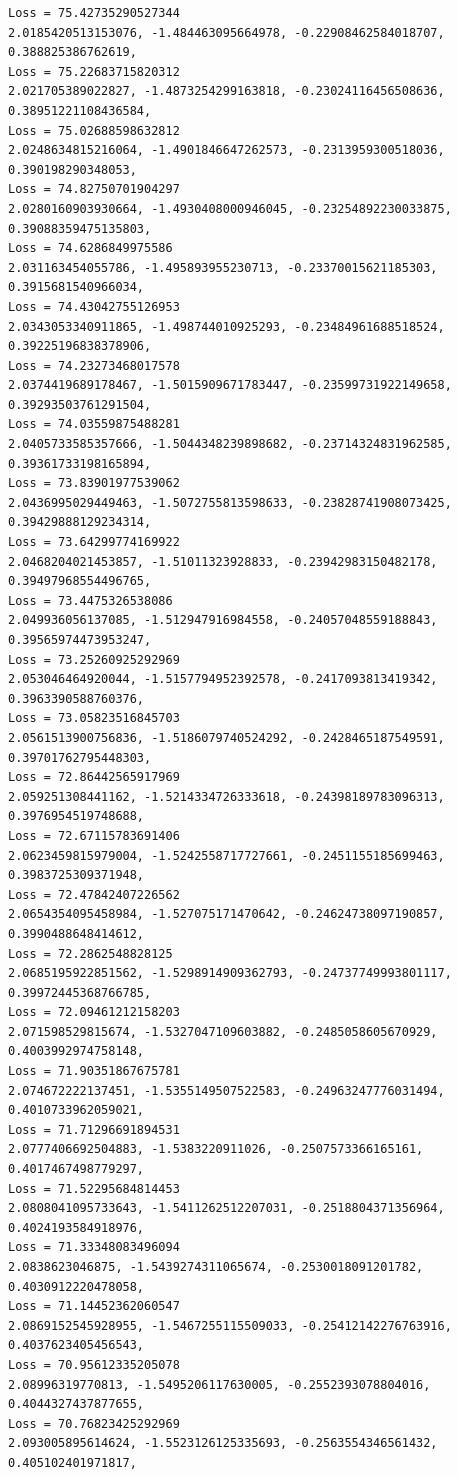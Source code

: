 \documentclass[11pt]{article}
\begin{document}
\begin{Verbatim}[commandchars=\\\{\}]
Loss = 75.42735290527344
2.0185420513153076, -1.484463095664978, -0.22908462584018707, 0.388825386762619,
Loss = 75.22683715820312
2.021705389022827, -1.4873254299163818, -0.23024116456508636,
0.38951221108436584,
Loss = 75.02688598632812
2.0248634815216064, -1.4901846647262573, -0.2313959300518036, 0.390198290348053,
Loss = 74.82750701904297
2.0280160903930664, -1.4930408000946045, -0.23254892230033875,
0.39088359475135803,
Loss = 74.6286849975586
2.031163454055786, -1.495893955230713, -0.23370015621185303, 0.3915681540966034,
Loss = 74.43042755126953
2.0343053340911865, -1.498744010925293, -0.23484961688518524,
0.39225196838378906,
Loss = 74.23273468017578
2.0374419689178467, -1.5015909671783447, -0.23599731922149658,
0.39293503761291504,
Loss = 74.03559875488281
2.0405733585357666, -1.5044348239898682, -0.23714324831962585,
0.39361733198165894,
Loss = 73.83901977539062
2.0436995029449463, -1.5072755813598633, -0.23828741908073425,
0.39429888129234314,
Loss = 73.64299774169922
2.0468204021453857, -1.51011323928833, -0.23942983150482178,
0.39497968554496765,
Loss = 73.4475326538086
2.049936056137085, -1.512947916984558, -0.24057048559188843,
0.39565974473953247,
Loss = 73.25260925292969
2.053046464920044, -1.5157794952392578, -0.2417093813419342, 0.3963390588760376,
Loss = 73.05823516845703
2.0561513900756836, -1.5186079740524292, -0.2428465187549591,
0.39701762795448303,
Loss = 72.86442565917969
2.059251308441162, -1.5214334726333618, -0.24398189783096313,
0.3976954519748688,
Loss = 72.67115783691406
2.0623459815979004, -1.5242558717727661, -0.2451155185699463,
0.3983725309371948,
Loss = 72.47842407226562
2.0654354095458984, -1.527075171470642, -0.24624738097190857,
0.3990488648414612,
Loss = 72.2862548828125
2.0685195922851562, -1.5298914909362793, -0.24737749993801117,
0.39972445368766785,
Loss = 72.09461212158203
2.071598529815674, -1.5327047109603882, -0.2485058605670929, 0.4003992974758148,
Loss = 71.90351867675781
2.074672222137451, -1.5355149507522583, -0.24963247776031494,
0.4010733962059021,
Loss = 71.71296691894531
2.0777406692504883, -1.5383220911026, -0.2507573366165161, 0.4017467498779297,
Loss = 71.52295684814453
2.0808041095733643, -1.5411262512207031, -0.2518804371356964,
0.4024193584918976,
Loss = 71.33348083496094
2.0838623046875, -1.5439274311065674, -0.2530018091201782, 0.4030912220478058,
Loss = 71.14452362060547
2.0869152545928955, -1.5467255115509033, -0.25412142276763916,
0.4037623405456543,
Loss = 70.95612335205078
2.08996319770813, -1.5495206117630005, -0.2552393078804016, 0.4044327437877655,
Loss = 70.76823425292969
2.093005895614624, -1.5523126125335693, -0.2563554346561432, 0.405102401971817,

\end{Verbatim}
\end{document}
